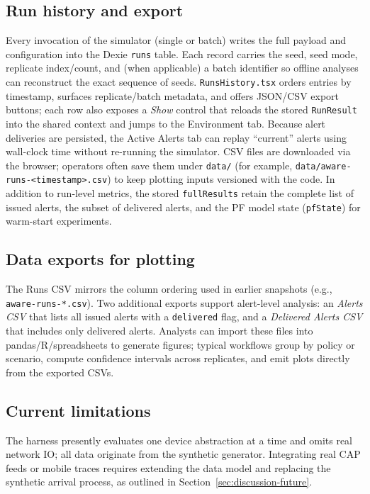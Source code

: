 \subsection{Run history and export}
Every invocation of the simulator (single or batch) writes the full payload and configuration into the Dexie \texttt{runs} table. Each record carries the seed, seed mode, replicate index/count, and (when applicable) a batch identifier so offline analyses can reconstruct the exact sequence of seeds. \texttt{RunsHistory.tsx} orders entries by timestamp, surfaces replicate/batch metadata, and offers JSON/CSV export buttons; each row also exposes a \emph{Show} control that reloads the stored \texttt{RunResult} into the shared context and jumps to the Environment tab. Because alert deliveries are persisted, the Active Alerts tab can replay ``current'' alerts using wall-clock time without re-running the simulator. CSV files are downloaded via the browser; operators often save them under \texttt{data/} (for example, \texttt{data/aware-runs-<timestamp>.csv}) to keep plotting inputs versioned with the code. In addition to run-level metrics, the stored \texttt{fullResults} retain the complete list of issued alerts, the subset of delivered alerts, and the PF model state (\texttt{pfState}) for warm-start experiments.

\subsection{Data exports for plotting}
The Runs CSV mirrors the column ordering used in earlier snapshots (e.g., \texttt{aware-runs-*.csv}). Two additional exports support alert-level analysis: an \emph{Alerts CSV} that lists all issued alerts with a \texttt{delivered} flag, and a \emph{Delivered Alerts CSV} that includes only delivered alerts. Analysts can import these files into pandas/R/spreadsheets to generate figures; typical workflows group by policy or scenario, compute confidence intervals across replicates, and emit plots directly from the exported CSVs.

\subsection{Current limitations}
The harness presently evaluates one device abstraction at a time and omits real network IO; all data originate from the synthetic generator. Integrating real CAP feeds or mobile traces requires extending the data model and replacing the synthetic arrival process, as outlined in Section~\ref{sec:discussion-future}.

